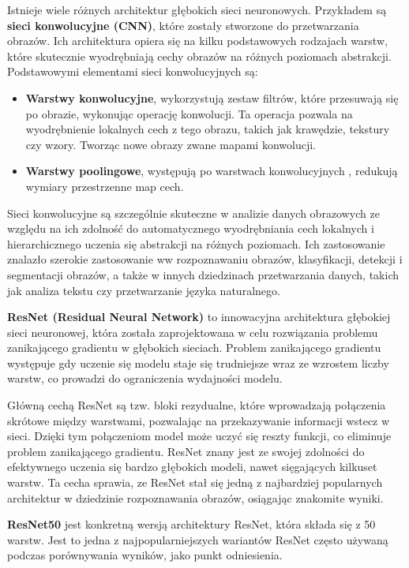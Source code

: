 Istnieje wiele różnych architektur głębokich sieci neuronowych.
Przykładem są \textbf{sieci konwolucyjne (CNN)}\cite{8379889}, które zostały stworzone do przetwarzania obrazów.
Ich architektura opiera się na kilku podstawowych rodzajach warstw, które skutecznie wyodrębniają cechy obrazów na różnych poziomach abstrakcji.
Podstawowymi elementami sieci konwolucyjnych są:
\begin{itemize}
	\item \textbf{Warstwy konwolucyjne}, wykorzystują zestaw filtrów, które przesuwają się po obrazie, wykonując operację konwolucji.
	      Ta operacja pozwala na wyodrębnienie lokalnych cech z tego obrazu, takich jak krawędzie, tekstury czy wzory.
	      Tworząc nowe obrazy zwane mapami konwolucji.
	\item \textbf{Warstwy poolingowe}, występują po warstwach konwolucyjnych , redukują wymiary przestrzenne map cech.
\end{itemize}
Sieci konwolucyjne są szczególnie skuteczne w analizie danych obrazowych ze względu na ich zdolność do automatycznego wyodrębniania cech lokalnych i hierarchicznego uczenia się abstrakcji na różnych poziomach.
Ich zastosowanie znalazło szerokie zastosowanie ww rozpoznawaniu obrazów, klasyfikacji, detekcji i segmentacji obrazów, a także w innych dziedzinach przetwarzania danych, takich jak analiza tekstu czy przetwarzanie języka naturalnego.

\textbf{ResNet (Residual Neural Network)}\cite{He_2016_CVPR} to innowacyjna architektura głębokiej sieci neuronowej, która została zaprojektowana w celu rozwiązania problemu zanikającego gradientu w głębokich sieciach.
Problem zanikającego gradientu występuje gdy uczenie się modelu staje się trudniejsze wraz ze wzrostem liczby warstw, co prowadzi do ograniczenia wydajności modelu.

Główną cechą ResNet są tzw. bloki rezydualne, które wprowadzają połączenia skrótowe między warstwami, pozwalając na przekazywanie informacji wstecz w sieci.
Dzięki tym połączeniom model może uczyć się reszty funkcji, co eliminuje problem zanikającego gradientu.
ResNet znany jest ze swojej zdolności do efektywnego uczenia się bardzo głębokich modeli, nawet sięgających kilkuset warstw.
Ta cecha sprawia, ze ResNet stał się jedną z najbardziej popularnych architektur w dziedzinie rozpoznawania obrazów, osiągając znakomite wyniki.

\textbf{ResNet50}\cite{Koonce2021} jest konkretną wersją architektury ResNet, która składa się z 50 warstw.
Jest to jedna z najpopularniejszych wariantów ResNet często używaną podczas porównywania wyników, jako punkt odniesienia.

